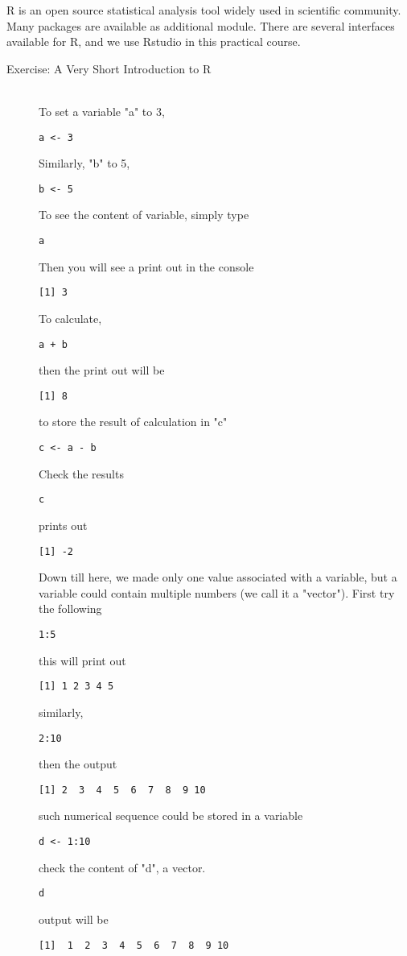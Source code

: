 \documentclass[11pnt]{article}
\begin{document}
R is an open source statistical analysis tool widely used in scientific community. Many packages are available as additional module. There are several interfaces available for R, and we use Rstudio in this practical course. 
\begin{description}

\item[Exercise: A Very Short Introduction to R]\hfill\\

To set a variable "a" to 3,

\verb"a <- 3"

Similarly, "b" to 5,

\verb"b <- 5"

To see the content of variable, simply type

\verb"a"

Then you will see a print out in the console

\verb"[1] 3"

To calculate, 

\verb"a + b"

then the print out will be

\verb"[1] 8"

to store the result of calculation in "c"

\verb"c <- a - b"

Check the results

\verb"c"

prints out

\verb"[1] -2"

Down till here, we made only one value associated with a variable, but a variable could contain multiple numbers (we call it a "vector"). First try the following

\verb"1:5"

this will print out

\verb"[1] 1 2 3 4 5"

similarly, 

\verb"2:10"

then the output

\verb"[1] 2  3  4  5  6  7  8  9 10"

such numerical sequence could be stored in a variable

\verb"d <- 1:10"

check the content of "d", a vector. 

\verb"d"

output will be

\verb"[1]  1  2  3  4  5  6  7  8  9 10"


\end{description}
\end{document}
